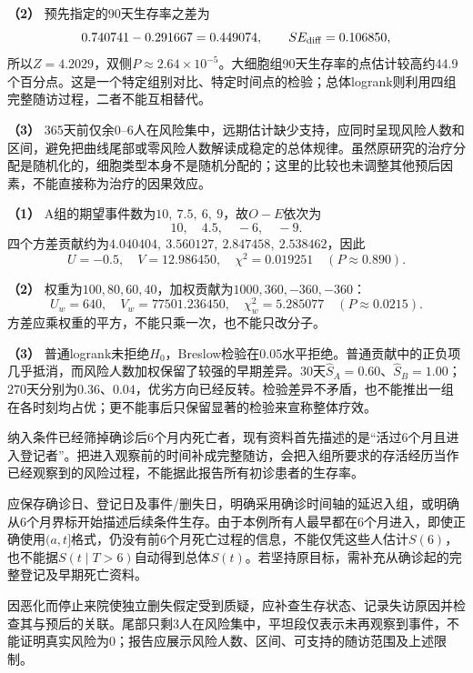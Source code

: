 \textbf{（2）} 预先指定的90天生存率之差为
\[
0.740741-0.291667=0.449074,\qquad
SE_{\rm diff}=0.106850,
\]
所以$Z=4.2029$，双侧$P\approx2.64\times10^{-5}$。大细胞组90天生存率的点估计较高约44.9个百分点。这是一个特定组别对比、特定时间点的检验；总体logrank则利用四组完整随访过程，二者不能互相替代。

\textbf{（3）} 365天前仅余0--6人在风险集中，远期估计缺少支持，应同时呈现风险人数和区间，避免把曲线尾部或零风险人数解读成稳定的总体规律。虽然原研究的治疗分配是随机化的，细胞类型本身不是随机分配的；这里的比较也未调整其他预后因素，不能直接称为治疗的因果效应。
\par\nobreak\smallskip{}

\textbf{（1）} A组的期望事件数为$10,\ 7.5,\ 6,\ 9$，故$O-E$依次为
\[
10,\quad4.5,\quad-6,\quad-9.
\]
四个方差贡献约为$4.040404,\ 3.560127,\ 2.847458,\ 2.538462$，因此
\[
U=-0.5,\quad V=12.986450,\quad
\chi^2=0.019251\quad(P\approx0.890).
\]

\textbf{（2）} 权重为$100,80,60,40$，加权贡献为$1000,360,-360,-360$：
\[
U_w=640,\quad V_w=77501.236450,\quad
\chi_w^2=5.285077\quad(P\approx0.0215).
\]
方差应乘权重的平方，不能只乘一次，也不能只改分子。

\textbf{（3）} 普通logrank未拒绝$H_0$，Breslow检验在0.05水平拒绝。普通贡献中的正负项几乎抵消，而风险人数加权保留了较强的早期差异。30天$\widehat S_A=0.60$、$\widehat S_B=1.00$；270天分别为$0.36$、$0.04$，优劣方向已经反转。检验差异不矛盾，也不能推出一组在各时刻均占优；更不能事后只保留显著的检验来宣称整体疗效。
\par\nobreak\smallskip{}

纳入条件已经筛掉确诊后6个月内死亡者，现有资料首先描述的是“活过6个月且进入登记者”。把进入观察前的时间补成完整随访，会把入组所要求的存活经历当作已经观察到的风险过程，不能据此报告所有初诊患者的生存率。

应保存确诊日、登记日及事件/删失日，明确采用确诊时间轴的延迟入组，或明确从6个月界标开始描述后续条件生存。由于本例所有人最早都在6个月进入，即使正确使用$(a,t]$格式，仍没有前6个月死亡过程的信息，不能仅凭这些人估计$S(6)$，也不能据$S(t\mid T>6)$自动得到总体$S(t)$。若坚持原目标，需补充从确诊起的完整登记及早期死亡资料。

因恶化而停止来院使独立删失假定受到质疑，应补查生存状态、记录失访原因并检查其与预后的关联。尾部只剩3人在风险集中，平坦段仅表示未再观察到事件，不能证明真实风险为0；报告应展示风险人数、区间、可支持的随访范围及上述限制。
\par\nobreak\smallskip{}
